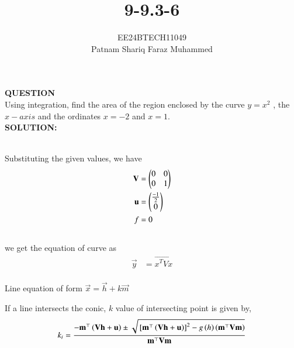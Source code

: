\documentclass[journal]{IEEEtran}
\numberwithin{equation}{enumi}
\numberwithin{figure}{enumi}
\begin{document}


\title{9-9.3-6}
\author{EE24BTECH11049 \\ Patnam Shariq Faraz Muhammed}

{\let\newpage\relax\maketitle}

\textbf{QUESTION} \\
    Using integration, find the area of the region enclosed by the curve $y = x^2$ , the $x-axis$ and the ordinates $x = - 2$ and $x = 1$.\\
\textbf{SOLUTION:} \\
    \begin{table}[h!]    
      \centering
      
      \label{table: 9-9.3-6}
    \end{table}\\

    Substituting the given values, we have \\
\begin{align}
	\mathbf{V} &= \begin{pmatrix} 0 & 0 \\ 0 & 1 \end{pmatrix} \\
	\mathbf{u} &= \begin{pmatrix} \frac{-1}{2} \\ 0 \end{pmatrix} \\
	f &= 0 
\end{align}\\

we get the equation of curve as \\
\begin{align}
	\vec{y} &= \vec{x^TVx}
\end{align}\\

Line equation of form $\vec{x}=\vec{h}+k\vec{m}$

If a line intersects the conic, $k$ value of intersecting point is given by,
\begin{align}
	k_i=\frac{-\mathbf{m}^{\top}\left(\mathbf{Vh}+\mathbf{u}\right)\pm\sqrt{{}\left[\mathbf{m}^{\top}\left(\mathbf{Vh}+\mathbf{u}\right)\right]^2-g\left(h\right)\left(\mathbf{m}^{\top}\mathbf{Vm}\right)}}{\mathbf{m}^{\top}\mathbf{Vm}}
\end{align}
\end{document}
